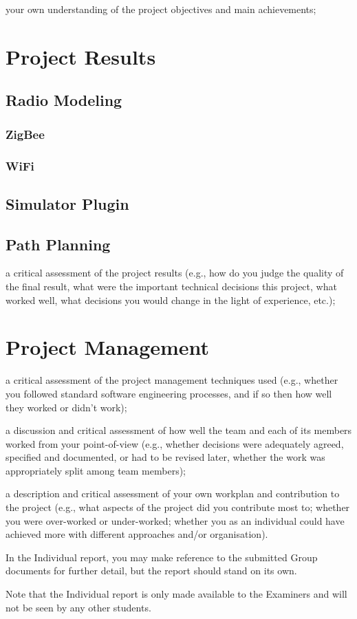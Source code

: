 your own understanding of the project objectives and main achievements;

\section{Project Results}
\subsection{Radio Modeling}
\subsubsection{ZigBee}
\subsubsection{WiFi}
\subsection{Simulator Plugin}
\subsection{Path Planning}
a critical assessment of the project results (e.g., how do you judge the
quality of the final result, what were the important technical decisions
this project, what worked well, what decisions you would change in the light
of experience, etc.);

\section{Project Management}
a critical assessment of the project management techniques used (e.g.,
whether you followed standard software engineering processes, and if so then
how well they worked or didn't work);

a discussion and critical assessment of how well the team and each of its
members worked from your point-of-view (e.g., whether decisions were
adequately agreed, specified and documented, or had to be revised later,
whether the work was appropriately split among team members);

a description and critical assessment of your own workplan and contribution
to the project (e.g., what aspects of the project did you contribute most
to; whether you were over-worked or under-worked; whether you as an
individual could have achieved more with different approaches and/or
organisation).

In the Individual report, you may make reference to the submitted Group
documents for further detail, but the report should stand on its own.

Note that the Individual report is only made available to the Examiners and will
not be seen by any other students.



